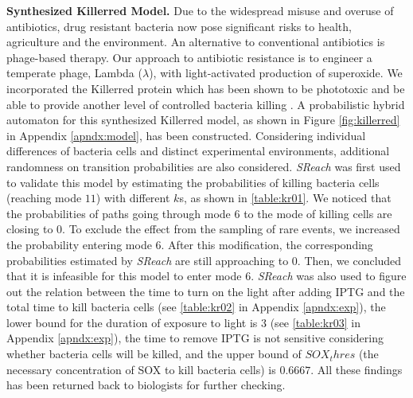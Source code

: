 \vspace{-.1cm}
{\bf Synthesized Killerred Model.} Due to the widespread misuse and overuse of antibiotics, drug resistant bacteria now pose significant risks to health, agriculture and the environment. An alternative to conventional antibiotics is phage-based therapy. Our approach to antibiotic resistance is to engineer a temperate phage, Lambda ($\lambda$), with light-activated production of superoxide. We incorporated the Killerred protein which has been shown to be phototoxic and be able to provide another level of controlled bacteria killing \cite{natasa2014killerred}. A probabilistic hybrid automaton for this synthesized Killerred model, as shown in Figure \ref{fig:killerred} in Appendix \ref{apndx:model}, has been constructed. Considering individual differences of bacteria cells and distinct experimental environments, additional randomness on transition probabilities are also considered. {\it SReach} was first used to validate this model by estimating the probabilities of killing bacteria cells (reaching mode $11$) with different $k$s, as shown in \ref{table:kr01}. We noticed that the probabilities of paths going through mode $6$ to the mode of killing cells are closing to $0$. To exclude the effect from the sampling of rare events, we increased the probability entering mode $6$. After this modification, the corresponding probabilities estimated by {\it SReach} are still approaching to $0$. Then, we concluded that it is infeasible for this model to enter mode $6$. {\it SReach} was also used to figure out the relation between the time to turn on the light after adding IPTG and the total time to kill bacteria cells (see \ref{table:kr02} in Appendix \ref{apndx:exp}), the lower bound for the duration of exposure to light is $3$ (see \ref{table:kr03} in Appendix \ref{apndx:exp}), the time to remove IPTG is not sensitive considering whether bacteria cells will be killed, and the upper bound of $SOX_thres$ (the necessary concentration of SOX to kill bacteria cells) is $0.6667$. All these findings has been returned back to biologists for further checking.

